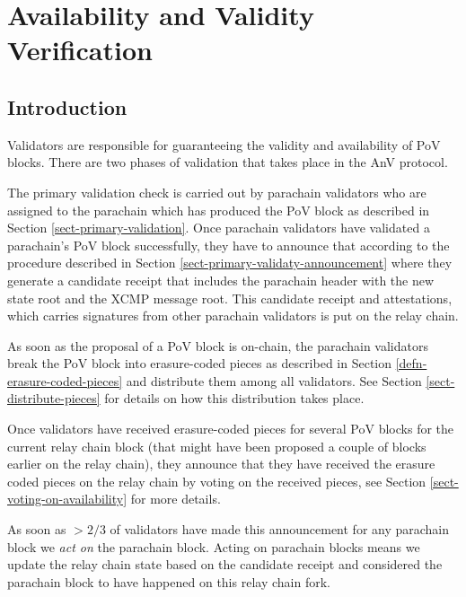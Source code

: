 \chapter{Availability and Validity Verification}

\section{Introduction}

Validators are responsible for guaranteeing the validity and availability of PoV blocks.
There are two phases of validation that takes place in the AnV protocol.
\newline

The primary validation check is carried out by parachain validators who are assigned to the parachain which has produced the PoV block as described in Section \ref{sect-primary-validation}. Once parachain validators have validated a parachain's PoV block successfully, they have to announce that according to the procedure described in Section \ref{sect-primary-validaty-announcement} where they generate a candidate receipt that includes the parachain header with the new state root and the XCMP message root. This candidate receipt and attestations, which carries signatures from other parachain validators is put on the relay chain.
\newline

As soon as the proposal of a PoV block is on-chain, the parachain validators break the PoV block into erasure-coded pieces as described in Section \ref{defn-erasure-coded-pieces} and distribute them among all validators. See Section \ref{sect-distribute-pieces} for details on how this distribution takes place.
\newline

Once validators have received erasure-coded pieces for several PoV blocks for the current relay chain block (that might have been proposed a couple of blocks earlier on the relay chain), they announce that they have received the erasure coded pieces on the relay chain by voting on the received pieces, see Section \ref{sect-voting-on-availability} for more details.
\newline

As soon as $>2/3$ of validators have made this announcement for any parachain block we \emph{act on} the parachain block. Acting on parachain blocks means we update the relay chain state based on the candidate receipt and considered the parachain block to have happened on this relay chain fork.
\newline

